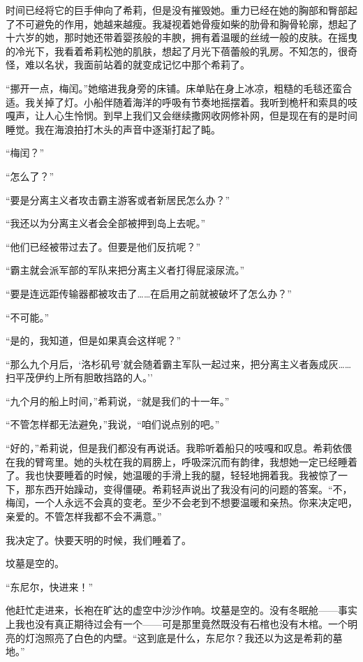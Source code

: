 \documentclass[AutoFakeBold=true]{book}
\begin{document}
时间已经将它的巨手伸向了希莉，但是没有摧毁她。重力已经在她的胸部和臀部起了不可避免的作用，她越来越瘦。我凝视着她骨瘦如柴的肋骨和胸骨轮廓，想起了十六岁的她，那时她还带着婴孩般的丰腴，拥有着温暖的丝绒一般的皮肤。在摇曳的冷光下，我看着希莉松弛的肌肤，想起了月光下蓓蕾般的乳房。不知怎的，很奇怪，难以名状，我面前站着的就变成记忆中那个希莉了。

``挪开一点，梅闰。''她缩进我身旁的床铺。床单贴在身上冰凉，粗糙的毛毯还蛮合适。我关掉了灯。小船伴随着海洋的呼吸有节奏地摇摆着。我听到桅杆和索具的吱嘎声，让人心生怜悯。到早上我们又会继续撒网收网修补网，但是现在有的是时间睡觉。我在海浪拍打木头的声音中逐渐打起了盹。

``梅闰？''

``怎么了？''

``要是分离主义者攻击霸主游客或者新居民怎么办？''

``我还以为分离主义者会全部被押到岛上去呢。''

``他们已经被带过去了。但要是他们反抗呢？''

``霸主就会派军部的军队来把分离主义者打得屁滚尿流。''

``要是连远距传输器都被攻击了……在启用之前就被破坏了怎么办？''

``不可能。''

``是的，我知道，但是如果真会这样呢？''

``那么九个月后，`洛杉矶号'就会随着霸主军队一起过来，把分离主义者轰成灰……扫平茂伊约上所有胆敢挡路的人。''

``九个月的船上时间，''希莉说，``就是我们的十一年。''

``不管怎样都无法避免，''我说，``咱们说点别的吧。''

``好的，''希莉说，但是我们都没有再说话。我聆听着船只的吱嘎和叹息。希莉依偎在我的臂弯里。她的头枕在我的肩膀上，呼吸深沉而有韵律，我想她一定已经睡着了。我也快要睡着的时候，她温暖的手滑上我的腿，轻轻地拥着我。我被惊了一下，那东西开始躁动，变得僵硬。希莉轻声说出了我没有问的问题的答案。``不，梅闰，一个人永远不会真的变老。至少不会老到不想要温暖和亲热。你来决定吧，亲爱的。不管怎样我都不会不满意。''

我决定了。快要天明的时候，我们睡着了。

\vspace*{1em}

坟墓是空的。

{\kaishu ``东尼尔，快进来！''}

他赶忙走进来，长袍在旷达的虚空中沙沙作响。坟墓是空的。没有冬眠舱——事实上我也没有真正期待过会有一个——可是那里竟然既没有石棺也没有木棺。一个明亮的灯泡照亮了白色的内壁。``这到底是什么，东尼尔？我还以为这是希莉的墓地。''
\end{document}
